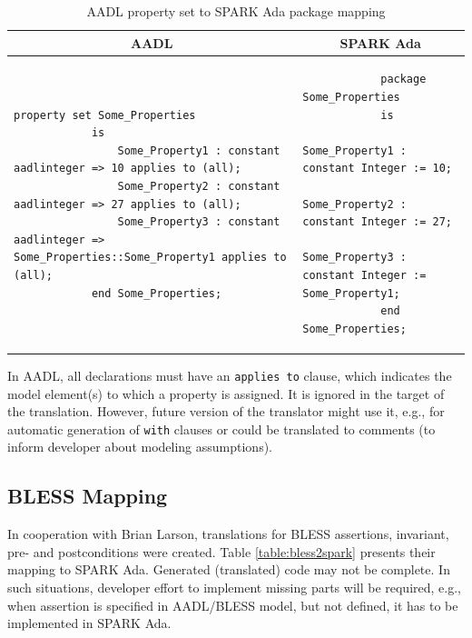 \singlespacing
\begin{table}[!ht]
	\caption{AADL property set to SPARK Ada package mapping}
	\label{table:propertyset_mapping}
	\centering
  	\begin{tabular}{ | p{3in} | p{3in} |}

		\hline
		\multicolumn{1}{|c|}{\textbf{AADL}} & \multicolumn{1}{|c|}{\textbf{SPARK Ada}} \\ \hline

		\begin{lstlisting}[language=aadl]
			property set Some_Properties 
			is
				Some_Property1 : constant aadlinteger => 10 applies to (all);
				Some_Property2 : constant aadlinteger => 27 applies to (all);
				Some_Property3 : constant aadlinteger => Some_Properties::Some_Property1 applies to (all);
			end Some_Properties;
		\end{lstlisting} 
		& 
		\begin{lstlisting}
			package Some_Properties
			is
				Some_Property1 : constant Integer := 10;
				Some_Property2 : constant Integer := 27;
				Some_Property3 : constant Integer := Some_Property1;
			end Some_Properties;
		\end{lstlisting} 		

		\\ \hline
	\end{tabular}
\end{table}
\doublespacing

In AADL, all declarations must have an \lstinline{applies to} clause, which indicates the model element(s) to which a property is assigned. It is ignored in the target of the translation. However, future version of the translator might use it, e.g., for automatic generation of \lstinline{with} clauses or could be translated to comments (to inform developer about modeling assumptions).


\subsection{BLESS Mapping}
\label{codegen:mapping:bless}

In cooperation with Brian Larson, translations for BLESS assertions, invariant, pre- and postconditions were created. Table \ref{table:bless2spark} presents their mapping to SPARK Ada. Generated (translated) code may not be complete. In such situations, developer effort to implement missing parts will be required, e.g., when assertion is specified in AADL/BLESS model, but not defined, it has to be implemented in SPARK Ada.

